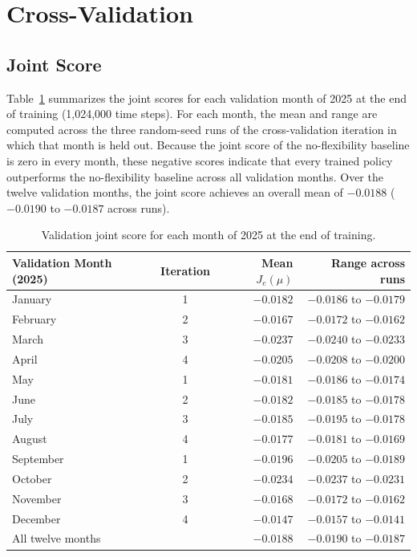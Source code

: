 \documentclass{UNCC-thesis}
\begin{document}
\section{Cross-Validation}
\label{sec:results-cv}

\subsection{Joint Score}
\label{subsec:results-cv-score}

Table~\ref{tab:months} summarizes the joint scores for each validation month of 2025 at the end of
training (1,024,000 time steps). For each month, the mean and range are computed across the three
random-seed runs of the cross-validation iteration in which that month is held out. Because the
joint score of the no-flexibility baseline is zero in every month, these negative scores indicate
that every trained policy outperforms the no-flexibility baseline across all validation months.
Over the twelve validation months, the joint score achieves an overall mean of \(-0.0188\)
(\(-0.0190\) to \(-0.0187\) across runs).

\begin{table}[htbp]
  \centering
  \footnotesize
  \caption[Validation joint score for each month of 2025]{Validation joint score for each month
  of 2025 at the end of training.}
  \label{tab:months}
  \begin{tabular}{@{}lcrr@{}}
    \toprule
    Validation Month (2025) & Iteration & Mean \(J_e(\mu)\) & Range across runs \\
    \midrule
    January   & 1 & \(-0.0182\) & \(-0.0186\) to \(-0.0179\) \\
    February  & 2 & \(-0.0167\) & \(-0.0172\) to \(-0.0162\) \\
    March     & 3 & \(-0.0237\) & \(-0.0240\) to \(-0.0233\) \\
    April     & 4 & \(-0.0205\) & \(-0.0208\) to \(-0.0200\) \\
    May       & 1 & \(-0.0181\) & \(-0.0186\) to \(-0.0174\) \\
    June      & 2 & \(-0.0182\) & \(-0.0185\) to \(-0.0178\) \\
    July      & 3 & \(-0.0185\) & \(-0.0195\) to \(-0.0178\) \\
    August    & 4 & \(-0.0177\) & \(-0.0181\) to \(-0.0169\) \\
    September & 1 & \(-0.0196\) & \(-0.0205\) to \(-0.0189\) \\
    October   & 2 & \(-0.0234\) & \(-0.0237\) to \(-0.0231\) \\
    November  & 3 & \(-0.0168\) & \(-0.0172\) to \(-0.0162\) \\
    December  & 4 & \(-0.0147\) & \(-0.0157\) to \(-0.0141\) \\
    \midrule
    All twelve months &   & \(-0.0188\) & \(-0.0190\) to \(-0.0187\) \\
    \bottomrule
  \end{tabular}
\end{table}
\end{document}
